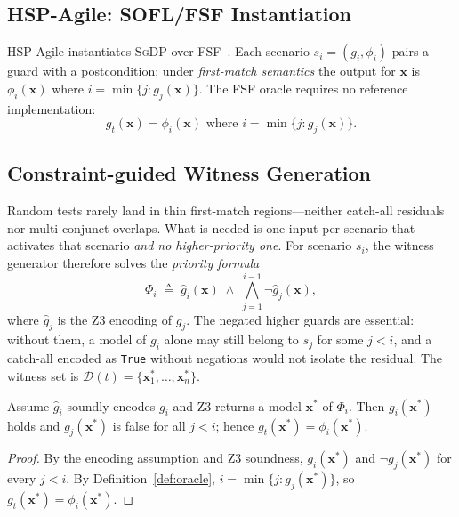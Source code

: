 \subsection{HSP-Agile: SOFL/FSF Instantiation}
\label{subsec:hsp-agile}

HSP-Agile instantiates \textsc{SgDP} over FSF~\cite{liu2004soflbook,li2022qrs_companion}.
Each scenario $s_i = (g_i, \phi_i)$ pairs a guard with a postcondition; under
\emph{first-match semantics} the output for $\mathbf{x}$ is $\phi_i(\mathbf{x})$ where
$i = \min\{j : g_j(\mathbf{x})\}$.
The FSF oracle requires no reference implementation:
\begin{equation}
  g_t(\mathbf{x}) = \phi_i(\mathbf{x}) \text{ where } i = \min\{j : g_j(\mathbf{x})\}.
\end{equation}

\subsection{Constraint-guided Witness Generation}
\label{subsec:witness-gen}

Random tests rarely land in thin first-match regions---neither catch-all
residuals nor multi-conjunct overlaps.
What is needed is one input per scenario that activates that scenario
\emph{and no higher-priority one}.
For scenario $s_i$, the witness generator therefore solves the
\emph{priority formula}
\begin{equation}
  \label{eq:priority}
  \Phi_i \;\triangleq\; \hat{g}_i(\mathbf{x}) \;\land\; \bigwedge_{j=1}^{i-1} \lnot\hat{g}_j(\mathbf{x}),
\end{equation}
where $\hat{g}_j$ is the Z3 encoding of $g_j$.
The negated higher guards are essential: without them, a model of $g_i$
alone may still belong to $s_j$ for some $j<i$, and a catch-all encoded as
\texttt{True} without negations would not isolate the residual.
The witness set is $\mathcal{D}(t) = \{\mathbf{x}_1^*, \ldots, \mathbf{x}_n^*\}$.

\begin{proposition}
\label{thm:witness-soundness}
Assume $\hat{g}_i$ soundly encodes $g_i$ and Z3 returns a model $\mathbf{x}^*$ of
$\Phi_i$.
Then $g_i(\mathbf{x}^*)$ holds and $g_j(\mathbf{x}^*)$ is false for all $j < i$;
hence $g_t(\mathbf{x}^*) = \phi_i(\mathbf{x}^*)$.
\end{proposition}
\begin{proof}
By the encoding assumption and Z3 soundness,
$g_i(\mathbf{x}^*)$ and $\lnot g_j(\mathbf{x}^*)$ for every $j<i$.
By Definition~\ref{def:oracle},
$i=\min\{j:g_j(\mathbf{x}^*)\}$, so
$g_t(\mathbf{x}^*)=\phi_i(\mathbf{x}^*)$.
\end{proof}

